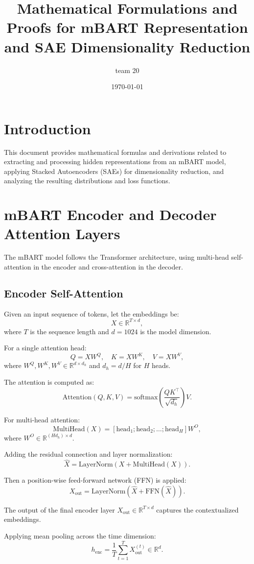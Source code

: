 \documentclass[11pt,a4paper]{article}
\title{Mathematical Formulations and Proofs for mBART Representation and SAE Dimensionality Reduction}
\author{team 20}
\date{\today}
\begin{document}
\maketitle

\section{Introduction}
This document provides mathematical formulas and derivations related to extracting and processing hidden representations from an mBART model, applying Stacked Autoencoders (SAEs) for dimensionality reduction, and analyzing the resulting distributions and loss functions.

\section{mBART Encoder and Decoder Attention Layers}
The mBART model follows the Transformer architecture, using multi-head self-attention in the encoder and cross-attention in the decoder.

\subsection{Encoder Self-Attention}
Given an input sequence of tokens, let the embeddings be:
\[
X \in \mathbb{R}^{T \times d},
\]
where $T$ is the sequence length and $d=1024$ is the model dimension.

For a single attention head:
\[
Q = X W^Q, \quad K = X W^K, \quad V = X W^V,
\]
where $W^Q, W^K, W^V \in \mathbb{R}^{d \times d_h}$ and $d_h = d/H$ for $H$ heads.

The attention is computed as:
\[
\text{Attention}(Q,K,V) = \text{softmax}\left(\frac{QK^\top}{\sqrt{d_h}}\right) V.
\]

For multi-head attention:
\[
\text{MultiHead}(X) = [\text{head}_1; \text{head}_2; \dots; \text{head}_H] W^O,
\]
where $W^O \in \mathbb{R}^{(H d_h) \times d}$.

Adding the residual connection and layer normalization:
\[
\hat{X} = \text{LayerNorm}(X + \text{MultiHead}(X)).
\]

Then a position-wise feed-forward network (FFN) is applied:
\[
X_{\text{out}} = \text{LayerNorm}(\hat{X} + \text{FFN}(\hat{X})).
\]

The output of the final encoder layer $X_{\text{out}} \in \mathbb{R}^{T \times d}$ captures the contextualized embeddings.

Applying mean pooling across the time dimension:
\[
h_{\text{enc}} = \frac{1}{T}\sum_{t=1}^T X_{\text{out}}^{(t)} \in \mathbb{R}^{d}.
\]
\end{document}
